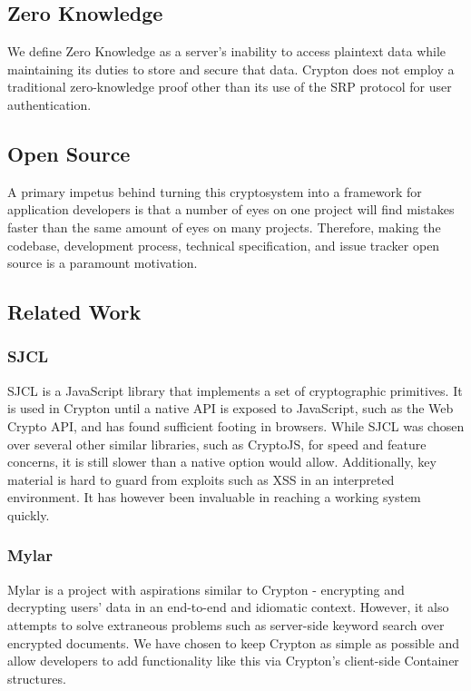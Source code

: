 \documentclass[conference]{IEEEtran}
\begin{document}
\subsection{Zero Knowledge}
We define Zero Knowledge as a server's inability to access plaintext data while
maintaining its duties to store and secure that data. Crypton does not employ a
traditional zero-knowledge proof other than its use of the SRP\cite{SRP}
protocol for user authentication.

\subsection{Open Source}
A primary impetus behind turning this cryptosystem into a framework for
application developers is that a number of eyes on one project will find mistakes
faster than the same amount of eyes on many projects. Therefore,
making the codebase, development process, technical specification,
and issue tracker open source is a paramount motivation.

\subsection{Related Work}

\subsubsection{SJCL}
SJCL is a JavaScript library that implements a set of cryptographic 
primitives\cite{sjcl}. It is used in Crypton until a native API is exposed to JavaScript,
such as the Web Crypto API, and has found sufficient footing in browsers.
While SJCL was chosen over several other similar libraries, such as
CryptoJS\cite{cryptojs}, for speed and feature concerns,
it is still slower than a native option would allow. Additionally,
key material is hard to guard from exploits such as XSS in an interpreted
environment. It has however been invaluable in reaching a working system quickly.

\subsubsection{Mylar}
Mylar\cite{mylar} is a project with aspirations similar to
Crypton - encrypting and decrypting users' data in an end-to-end and idiomatic context.
However, it also attempts\cite{mylarpaper} to solve extraneous problems
such as server-side keyword search over encrypted documents.
We have chosen to keep Crypton as simple as possible and allow developers to add
functionality like this via Crypton's client-side Container structures.
\end{document}
